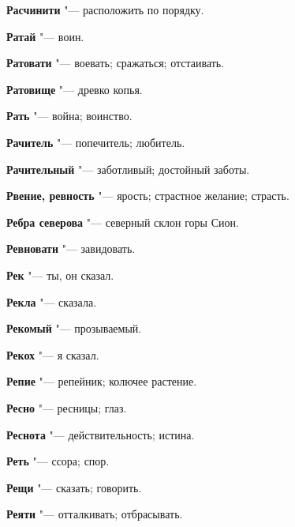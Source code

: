 \begin{mymulticols}{2}
\noindent\textbf{Расчинити} "--- расположить по порядку. 




\noindent\textbf{Ратай} "--- воин. 




\noindent\textbf{Ратовати} "--- воевать; сражаться; отстаивать. 




\noindent\textbf{Ратовище} "--- древко копья. 




\noindent\textbf{Рать} "--- война; воинство. 




\noindent\textbf{Рачитель} "--- попечитель; любитель. 




\noindent\textbf{Рачительный} "--- заботливый; достойный заботы. 




\noindent\textbf{Рвение, ревность} "--- ярость; страстное желание; страсть. 




\noindent\textbf{Ребра северова} "--- северный склон горы Сион. 




\noindent\textbf{Ревновати} "--- завидовать. 




\noindent\textbf{Рек} "--- ты, он сказал. 




\noindent\textbf{Рекла} "--- сказала. 




\noindent\textbf{Рекомый} "--- прозываемый. 




\noindent\textbf{Рекох} "--- я сказал. 




\noindent\textbf{Репие} "--- репейник; колючее растение. 




\noindent\textbf{Ресно} "--- ресницы; глаз. 




\noindent\textbf{Реснота} "--- действительность; истина. 




\noindent\textbf{Реть} "--- ссора; спор. 




\noindent\textbf{Рещи} "--- сказать; говорить. 




\noindent\textbf{Реяти} "--- отталкивать; отбрасывать. 





\end{mymulticols}
